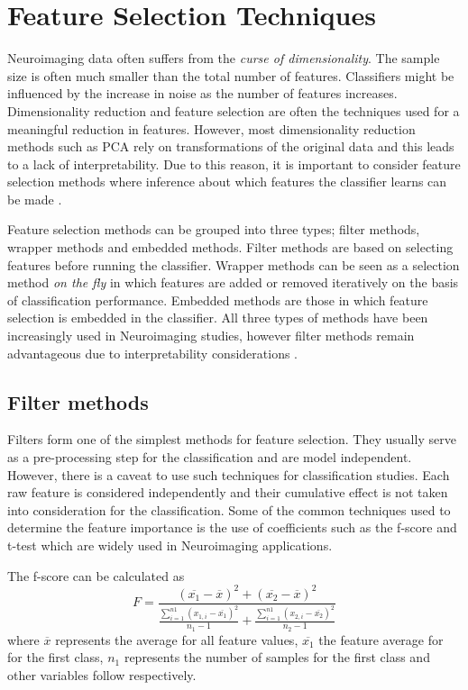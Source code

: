 \documentclass[msthesis.tex]{subfiles}
\begin{document}
\section{Feature Selection Techniques}
\label{sec:feature_selection}
Neuroimaging data often suffers from the \textit{curse of dimensionality}. The sample size is often much smaller than the total number of features. Classifiers might be influenced by the increase in noise as the number of features increases. Dimensionality reduction and feature selection are often the techniques used for a meaningful reduction in features. However, most dimensionality reduction methods such as \gls{PCA} rely on transformations of the original data and this leads to a lack of interpretability. Due to this reason, it is important to consider feature selection methods where inference about which features the classifier learns can be made \citep{shi2018feature}. 

Feature selection methods can be grouped into three types; filter methods, wrapper methods and embedded methods. Filter methods are based on selecting features before running the classifier. Wrapper methods can be seen as a selection method \textit{on the fly} in which features are added or removed iteratively on the basis of classification performance. Embedded methods are those in which feature selection is embedded in the classifier. All three types of methods have been increasingly used in Neuroimaging studies, however filter methods remain advantageous due to interpretability considerations \citep{tohka2016comparison}.

\subsection{Filter methods}
\label{subsec:filtermethods}
Filters form one of the simplest methods for feature selection. They usually serve as a pre-processing step for the classification and are model independent. However, there is a caveat to use such techniques for classification studies. Each raw feature is considered independently and their cumulative effect is not taken into consideration for the classification. Some of the common techniques used to determine the feature importance is the use of coefficients such as the f-score and t-test which are widely used in Neuroimaging applications.

The f-score can be calculated as 
\begin{equation}
\label{eq:fscores}
    F = \frac{(\overline{x_{1}} - \overline{x})^2 + (\overline{x_{2}} - \overline{x})^2}
    {\frac{\sum_{i=1}^{n1}(x_{1,i} - \overline{x_{1}})^2}{n_{1} -1} + \frac{\sum_{i=1}^{n1}(x_{2,i} - \overline{x_{2}})^2}{n_{2} -1}}
\end{equation}
where $\overline{x}$ represents the average for all feature values, $\overline{x_{1}}$ the feature average for for the first class, $n_{1}$ represents the number of samples for the first class and other variables follow respectively.
\end{document}
